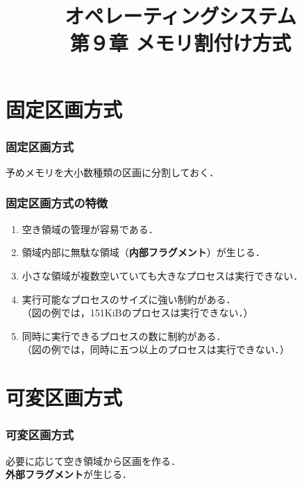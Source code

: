 \documentclass{beamer}                   %
\begin{document}
\title[主記憶]{オペレーティングシステム\\第９章 メモリ割付け方式}
\date{}

\begin{frame}
  \titlepage
\end{frame}


\section{固定区画方式}
\begin{frame}
  \frametitle{固定区画方式}
  予めメモリを大小数種類の区画に分割しておく．
\end{frame}

\begin{frame}
  \frametitle{固定区画方式の特徴}
  \begin{enumerate}
  \item 空き領域の管理が容易である．
  \item 領域内部に無駄な領域（{\bf 内部フラグメント}）が生じる．
  \item 小さな領域が複数空いていても大きなプロセスは実行できない．
  \item 実行可能なプロセスのサイズに強い制約がある．\\
    （図の例では，151KiBのプロセスは実行できない．）
  \item 同時に実行できるプロセスの数に制約がある．\\
    （図の例では，同時に五つ以上のプロセスは実行できない．）
  \end{enumerate}
\end{frame}

\section{可変区画方式}
\begin{frame}
  \frametitle{可変区画方式}
  必要に応じて空き領域から区画を作る．\\
  {\bf 外部フラグメント}が生じる．
\end{frame}
\end{document}
